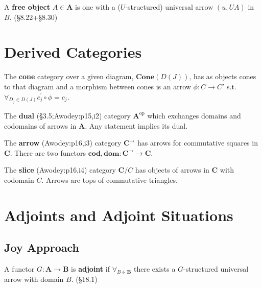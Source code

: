 \documentclass[10pt,twocolumn,letterpaper]{article}
\newcommand{\defn}[1]{{\bf #1}}
\begin{document}

  A \defn{free object} $A \in \mathbf{A}$ is one with a ($U$-structured)
  universal arrow $(u,UA)$ in $B$. (\S8.22+\S8.30)


\section{Derived Categories}

  The \defn{cone} category over a given diagram, $\mathbf{Cone}(D(J))$, has
  as objects cones to that diagram and a morphism between cones is an arrow
  $\phi : C \to C'$ s.t.  $\forall_{D_j \in D(J)} c_j^\prime \circ \phi =
  c_j$.

  The \defn{dual} (\S3.5;Awodey:p15,i2) category $\mathbf{A}^\text{op}$
  which exchanges domains and codomains of arrows in $\mathbf{A}$.  Any
  statement implies its dual.

  The \defn{arrow} (Awodey:p16,i3) category $\mathbf{C}^\to$ has arrows for
  commutative squares in $\mathbf{C}$.  There are two functors
  $\mathbf{cod}, \mathbf{dom} : \mathbf{C}^\to \to \mathbf{C}$.

  The \defn{slice} (Awodey:p16,i4) category $\mathbf{C}/C$ has objects of
  arrows in $\mathbf{C}$ with codomain $C$.  Arrows are tops of commutative
  triangles.

\section{Adjoints and Adjoint Situations}

\subsection{Joy Approach}

  A functor $G : \mathbf{A} \to \mathbf{B}$ is \defn{adjoint} if
  $\forall_{B \in \mathbf{B}}$ there exists a $G$-structured universal
  arrow with domain $B$.  (\S18.1)
\end{document}
